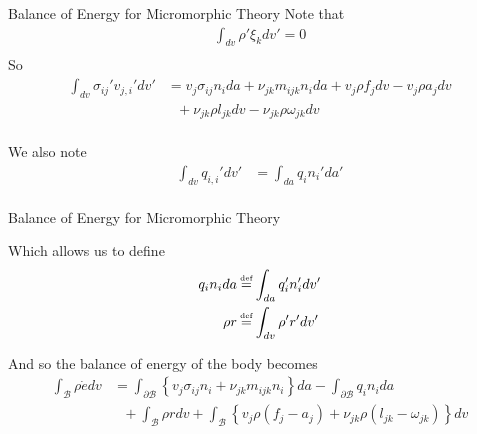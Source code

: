 \documentclass[11pt]{beamer}
\newcommand\defeq{\mathrel{\stackrel{\makebox[0pt]{\mbox{\normalfont\tiny def}}}{=}}}
\begin{document}
\begin{frame}{Balance of Energy for Micromorphic Theory}
Note that
\begin{align*}
\int_{dv}\rho'\xi_k dv' = 0\\
\end{align*}
So
\begin{align*}
\int_{dv} \sigma_{ij}' v_{j,i}' dv' &= v_j \sigma_{ij} n_i da + \nu_{jk} m_{ijk} n_i da+ v_j \rho f_j dv - v_j \rho a_j dv\\
&\ \ \   + \nu_{jk} \rho l_{jk} dv - \nu_{jk}\rho \omega_{jk} dv\\
\end{align*}

We also note
\begin{align*}
\int_{dv} q_{i,i}' dv' &= \int_{da} q_{i} n_i' da'\\
\end{align*}

\end{frame}

\begin{frame}{Balance of Energy for Micromorphic Theory}

Which allows us to define
\begin{align*}
q_i n_i da &\defeq \int_{da} q_i' n_i' dv'\\
\rho r &\defeq \int_{dv} \rho' r' dv'\\
\end{align*}

And so the balance of energy of the body becomes
\begin{align*}
\int_{\mathcal{B}} \rho \dot{e} dv &= \int_{\partial \mathcal{B}}\left\{ v_j \sigma_{ij} n_i + \nu_{jk} m_{ijk} n_i\right\}da - \int_{\partial \mathcal{B}} q_i n_i da\\
&\ \ \  + \int_{\mathcal{B}}\rho r dv + \int_{\mathcal{B}}\left\{v_j \rho \left(f_j - a_j\right) + \nu_{jk}\rho\left( l_{jk} - \omega_{jk}\right) \right\}dv\\
\end{align*}

\end{frame}
\end{document}
